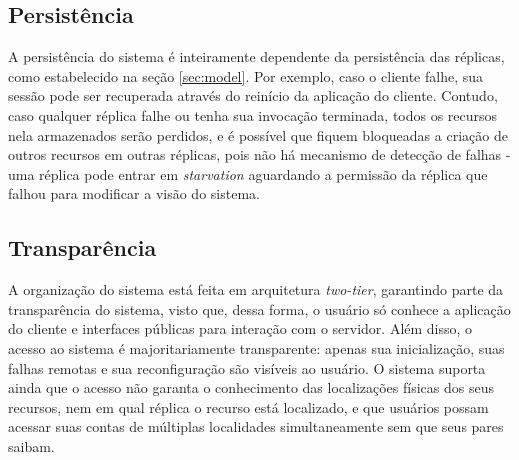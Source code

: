 \documentclass[../main.tex]{subfiles}
\begin{document}
\subsection{Persistência}

A persistência do sistema é inteiramente dependente da persistência das réplicas, como estabelecido na seção \ref{sec:model}.
Por exemplo, caso o cliente falhe, sua sessão pode ser recuperada através do reinício da aplicação do cliente.
Contudo, caso qualquer réplica falhe ou tenha sua invocação terminada, todos os recursos nela armazenados serão perdidos, e é possível que fiquem bloqueadas a criação de outros recursos em outras réplicas, pois não há mecanismo de detecção de falhas - uma réplica pode entrar em \textit{starvation} aguardando a permissão da réplica que falhou para modificar a visão do sistema.

\subsection{Transparência}

A organização do sistema está feita em arquitetura \textit{two-tier}, garantindo parte da transparência do sistema, visto que, dessa forma, o usuário só conhece a aplicação do cliente e interfaces públicas para interação com o servidor.
Além disso, o acesso ao sistema é majoritariamente transparente: apenas sua inicialização, suas falhas remotas e sua reconfiguração são visíveis ao usuário.
O sistema suporta ainda que o acesso não garanta o conhecimento das localizações físicas dos seus recursos, nem em qual réplica o recurso está localizado, e que usuários possam acessar suas contas de múltiplas localidades simultaneamente sem que seus pares saibam.
\end{document}
